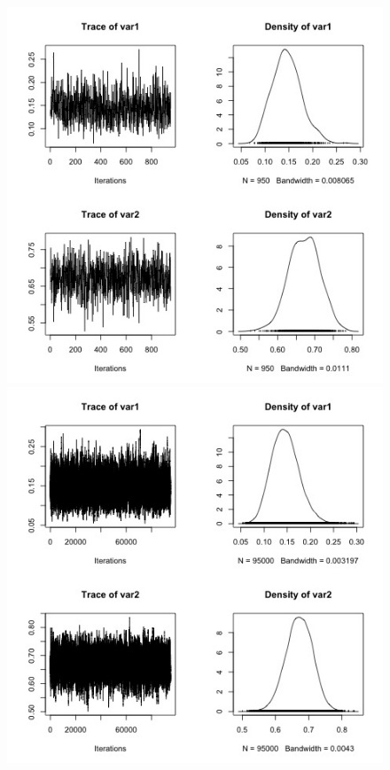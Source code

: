 \documentclass[11pt,a4paper]{article}
\begin{document}
\begin{figure}[h!]
  \includegraphics[scale=0.33]{images/metro_5000_100.jpg}
  \includegraphics[scale=0.33]{images/metropolis_5000_0.jpg}

\end{figure}
\end{document}
